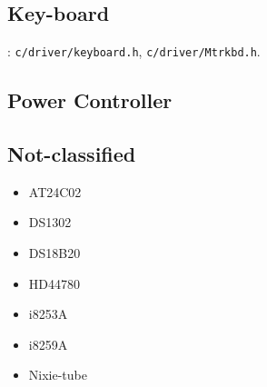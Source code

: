 \subsection{Key-board}
: \verb`c/driver/keyboard.h`, \verb`c/driver/Mtrkbd.h`.

\subsection{Power Controller}

\subsection{Not-classified}
\begin{itemize}
\item AT24C02
\item DS1302
\item DS18B20
\item HD44780
\item i8253A
\item i8259A
\item Nixie-tube
\end{itemize}


